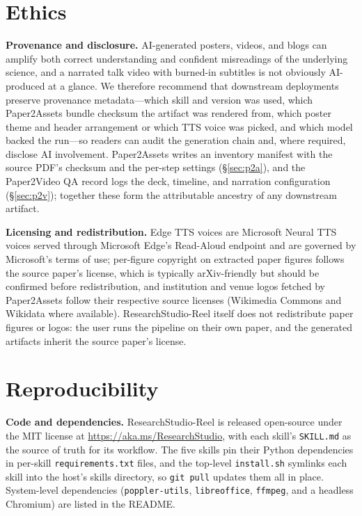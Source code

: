 \documentclass{article}
\begin{document}
\section{Ethics}\label{app:ethics}

\textbf{Provenance and disclosure.} AI-generated posters, videos, and blogs can amplify both correct understanding and confident misreadings of the underlying science, and a narrated talk video with burned-in subtitles is not obviously AI-produced at a glance. We therefore recommend that downstream deployments preserve provenance metadata---which skill and version was used, which Paper2Assets bundle checksum the artifact was rendered from, which poster theme and header arrangement or which TTS voice was picked, and which model backed the run---so readers can audit the generation chain and, where required, disclose AI involvement. Paper2Assets writes an inventory manifest with the source PDF's checksum and the per-step settings (\S\ref{sec:p2a}), and the Paper2Video QA record logs the deck, timeline, and narration configuration (\S\ref{sec:p2v}); together these form the attributable ancestry of any downstream artifact.

\textbf{Licensing and redistribution.} Edge TTS \citep{edgetts} voices are Microsoft Neural TTS voices served through Microsoft Edge's Read-Aloud endpoint and are governed by Microsoft's terms of use; per-figure copyright on extracted paper figures follows the source paper's license, which is typically arXiv-friendly but should be confirmed before redistribution, and institution and venue logos fetched by Paper2Assets follow their respective source licenses (Wikimedia Commons and Wikidata where available). ResearchStudio-Reel itself does not redistribute paper figures or logos: the user runs the pipeline on their own paper, and the generated artifacts inherit the source paper's license.

\section{Reproducibility}\label{app:repro}

\textbf{Code and dependencies.} ResearchStudio-Reel is released open-source under the MIT license at \url{https://aka.ms/ResearchStudio}, with each skill's \texttt{SKILL.md} as the source of truth for its workflow. The five skills pin their Python dependencies in per-skill \texttt{requirements.txt} files, and the top-level \texttt{install.sh} symlinks each skill into the host's skills directory, so \texttt{git pull} updates them all in place. System-level dependencies (\texttt{poppler-utils}, \texttt{libreoffice}, \texttt{ffmpeg}, and a headless Chromium) are listed in the README.
\end{document}
